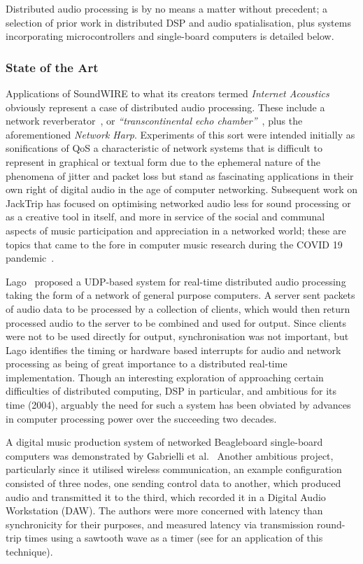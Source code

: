 Distributed audio processing is by no means a matter without precedent;
a selection of prior work in distributed DSP and audio spatialisation, plus
systems incorporating microcontrollers and single-board computers is detailed
below.

\subsubsection{State of the Art}

Applications of SoundWIRE to what its creators termed \textit{Internet
Acoustics}~\citep{chafe_physical_2002} obviously represent a case of distributed
audio processing.
These include a network reverberator~\citep{chafe_i_2018}, or
\textit{``transcontinental echo chamber''}~\citep{chafe_simplified_2000},
plus the aforementioned \textit{Network Harp}.
Experiments of this sort were intended initially as sonifications of QoS
\textemdash{} a characteristic of network systems that is difficult to represent
in graphical or textual form due to the ephemeral nature of the phenomena of
jitter and packet loss \textemdash{} but stand as fascinating applications in
their own right of digital audio in the age of computer networking.
Subsequent work on JackTrip has focused on optimising networked audio less
for sound processing or as a creative tool in itself, and more in service of
the social and communal aspects of music participation and appreciation in a
networked world;
these are topics that came to the fore in computer music research during the
COVID 19 pandemic~\citep{bosi_experiencing_2021,sacchetto_jacktrip-webrtc_2021}.

Lago~\citep{lago_distributed_2004} proposed a UDP-based system for real-time
distributed audio processing taking the form of a network of general purpose
computers.
A server sent packets of audio data to be processed by a collection of
clients, which would then return processed audio to the server to be combined
and used for output.
Since clients were not to be used directly for output, synchronisation was not
important, but Lago identifies the timing or hardware based interrupts for
audio and network processing as being of great importance to a distributed
real-time implementation.
Though an interesting exploration of approaching certain difficulties of
distributed computing, DSP in particular, and ambitious for its time (2004),
arguably the need for such a system has been obviated by advances in computer
processing power over the succeeding two decades.

A digital music production system of networked Beagleboard single-board
computers was demonstrated by Gabrielli et al.~\citep{gabrielli_networked_2012}
Another ambitious project, particularly since it utilised wireless
communication, an example configuration consisted of three nodes, one sending
control data to another, which produced audio and transmitted it to the third,
which recorded it in a Digital Audio Workstation (DAW).
The authors were more concerned with latency than synchronicity for their
purposes, and measured latency via transmission round-trip times using a
sawtooth wave as a timer (see  for an
application of this technique).

